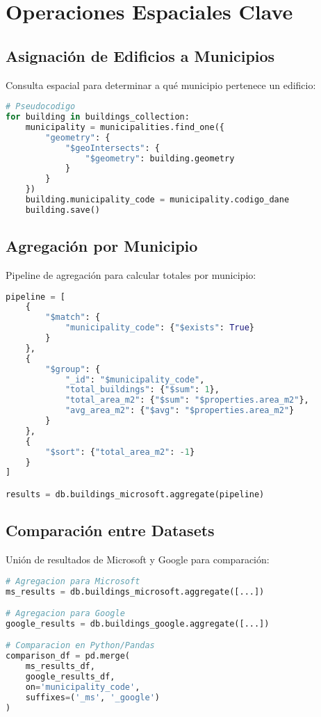\documentclass[12pt,a4paper]{article}
\begin{document}
\newpage
\section{Operaciones Espaciales Clave}

\subsection{Asignación de Edificios a Municipios}

Consulta espacial para determinar a qué municipio pertenece un edificio:

\begin{lstlisting}[language=Python,basicstyle=\small\ttfamily,breaklines=true]
# Pseudocodigo
for building in buildings_collection:
    municipality = municipalities.find_one({
        "geometry": {
            "$geoIntersects": {
                "$geometry": building.geometry
            }
        }
    })
    building.municipality_code = municipality.codigo_dane
    building.save()
\end{lstlisting}

\subsection{Agregación por Municipio}

Pipeline de agregación para calcular totales por municipio:

\begin{lstlisting}[language=Python,basicstyle=\small\ttfamily,breaklines=true]
pipeline = [
    {
        "$match": {
            "municipality_code": {"$exists": True}
        }
    },
    {
        "$group": {
            "_id": "$municipality_code",
            "total_buildings": {"$sum": 1},
            "total_area_m2": {"$sum": "$properties.area_m2"},
            "avg_area_m2": {"$avg": "$properties.area_m2"}
        }
    },
    {
        "$sort": {"total_area_m2": -1}
    }
]

results = db.buildings_microsoft.aggregate(pipeline)
\end{lstlisting}

\subsection{Comparación entre Datasets}

Unión de resultados de Microsoft y Google para comparación:

\begin{lstlisting}[language=Python,basicstyle=\small\ttfamily,breaklines=true]
# Agregacion para Microsoft
ms_results = db.buildings_microsoft.aggregate([...])

# Agregacion para Google
google_results = db.buildings_google.aggregate([...])

# Comparacion en Python/Pandas
comparison_df = pd.merge(
    ms_results_df, 
    google_results_df, 
    on='municipality_code',
    suffixes=('_ms', '_google')
)
\end{lstlisting}
\end{document}
